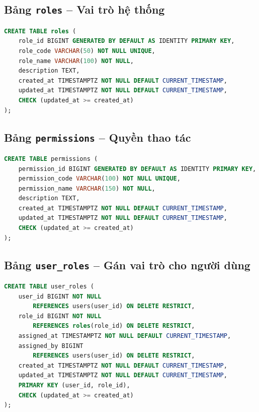 \subsection{Bảng \texttt{roles} -- Vai trò hệ thống}
\label{physical-roles}
\begin{lstlisting}[language=SQL,breaklines=true,basicstyle=\ttfamily\scriptsize]
CREATE TABLE roles (
    role_id BIGINT GENERATED BY DEFAULT AS IDENTITY PRIMARY KEY,
    role_code VARCHAR(50) NOT NULL UNIQUE,
    role_name VARCHAR(100) NOT NULL,
    description TEXT,
    created_at TIMESTAMPTZ NOT NULL DEFAULT CURRENT_TIMESTAMP,
    updated_at TIMESTAMPTZ NOT NULL DEFAULT CURRENT_TIMESTAMP,
    CHECK (updated_at >= created_at)
);
\end{lstlisting}
\subsection{Bảng \texttt{permissions} -- Quyền thao tác}
\label{physical-permissions}
\begin{lstlisting}[language=SQL,breaklines=true,basicstyle=\ttfamily\scriptsize]
CREATE TABLE permissions (
    permission_id BIGINT GENERATED BY DEFAULT AS IDENTITY PRIMARY KEY,
    permission_code VARCHAR(100) NOT NULL UNIQUE,
    permission_name VARCHAR(150) NOT NULL,
    description TEXT,
    created_at TIMESTAMPTZ NOT NULL DEFAULT CURRENT_TIMESTAMP,
    updated_at TIMESTAMPTZ NOT NULL DEFAULT CURRENT_TIMESTAMP,
    CHECK (updated_at >= created_at)
);
\end{lstlisting}
\subsection{Bảng \texttt{user\_roles} -- Gán vai trò cho người dùng}
\label{physical-user_roles}
\begin{lstlisting}[language=SQL,breaklines=true,basicstyle=\ttfamily\scriptsize]
CREATE TABLE user_roles (
    user_id BIGINT NOT NULL
        REFERENCES users(user_id) ON DELETE RESTRICT,
    role_id BIGINT NOT NULL
        REFERENCES roles(role_id) ON DELETE RESTRICT,
    assigned_at TIMESTAMPTZ NOT NULL DEFAULT CURRENT_TIMESTAMP,
    assigned_by BIGINT
        REFERENCES users(user_id) ON DELETE RESTRICT,
    created_at TIMESTAMPTZ NOT NULL DEFAULT CURRENT_TIMESTAMP,
    updated_at TIMESTAMPTZ NOT NULL DEFAULT CURRENT_TIMESTAMP,
    PRIMARY KEY (user_id, role_id),
    CHECK (updated_at >= created_at)
);
\end{lstlisting}
